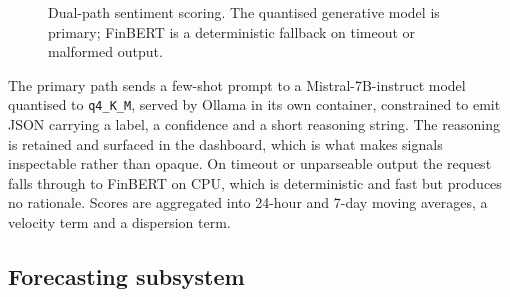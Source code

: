 \documentclass[preprint,12pt,authoryear]{elsarticle}
\begin{document}
\begin{figure}[t]\centering
{}
\caption{Dual-path sentiment scoring. The quantised generative model is primary;
FinBERT is a deterministic fallback on timeout or malformed output.}
\label{fig:sentiment}
\end{figure}

The primary path sends a few-shot prompt to a Mistral-7B-instruct model quantised
to \texttt{q4\_K\_M}, served by Ollama in its own container, constrained to emit
JSON carrying a label, a confidence and a short reasoning string. The reasoning
is retained and surfaced in the dashboard, which is what makes signals
inspectable rather than opaque. On timeout or unparseable output the request
falls through to FinBERT on CPU, which is deterministic and fast but produces no
rationale. Scores are aggregated into 24-hour and 7-day moving averages, a
velocity term and a dispersion term.

\subsection{Forecasting subsystem}
\label{ssec:forecast}
\end{document}

